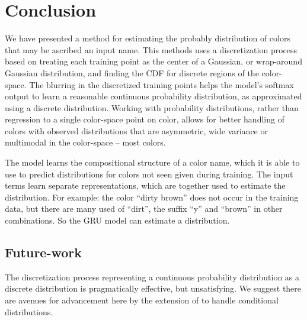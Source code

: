 \documentclass[11pt,letterpaper]{article}
\newcommand{\textcite}{\newcite}
\begin{document}
\section{Conclusion}
We have presented a method for estimating the probably distribution of colors that may be ascribed an input name.
This methods uses a discretization process based on treating each training point as the center of a Gaussian, or wrap-around Gaussian distribution, and finding the CDF for discrete regions of the color-space.
The blurring in the discretized training points helps the model's softmax output to learn a reasonable continuous probability distribution, as approximated using a discrete distribution.
Working with probability distributions, rather than regression to a single color-space point on color, allows for better handling of colors with observed distributions that are asymmetric, wide variance or multimodal in the color-space -- most colors.

The model learns the compositional structure of a color name, which it is able to use to predict distributions for colors not seen given during training.
The input terms learn separate representations, which are together used to estimate the distribution.
For example: the color ``dirty brown'' does not occur in the training data, but there are many used of ``dirt'', the suffix ``y'' and ``brown'' in other combinations.
So the GRU model can estimate a distribution.






\subsection{Future-work}


The discretization process representing a continuous probability distribution as a discrete distribution is pragmatically effective, but unsatisfying.
We suggest there are avenues for advancement here by the extension of \textcite{magdon1998neural} to handle conditional distributions.





\end{document}
